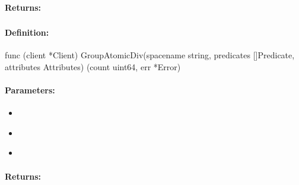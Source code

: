 \paragraph{Returns:}


\pagebreak
\subsubsection{}
\label{api:Go:GroupAtomicDiv}


\paragraph{Definition:}
\begin{gocode}
func (client *Client) GroupAtomicDiv(spacename string, predicates []Predicate, attributes Attributes) (count uint64, err *Error)
\end{gocode}

\paragraph{Parameters:}
\begin{itemize}[noitemsep]
\item {}\\

\item {}\\

\item {}\\

\end{itemize}

\paragraph{Returns:}


\pagebreak
\subsubsection{}
\label{api:Go:AtomicMod}



